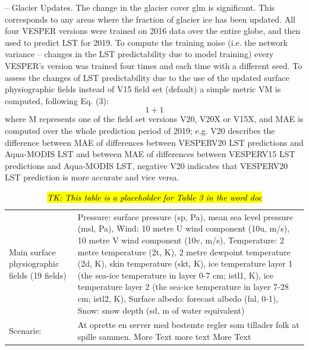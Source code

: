 \documentclass[hess, manuscript]{copernicus}
\begin{document}
– Glacier Updates. The change in the glacier cover glm is significant. This corresponds to any areas where the fraction of glacier ice has been updated.
All four VESPER versions were trained on 2016 data over the entire globe, and then used to predict LST for 2019. To compute the training noise (i.e. the network variance – changes in the LST predictability due to model training) every VESPER’s version was trained four times and each time with a different seed. To assess the changes of LST predictability due to the use of the updated surface physiographic fields instead of V15 field set (default) a simple metric VM is computed, following Eq. (3):
\begin{equation}
	1+1
\end{equation}
where M represents one of the field set versions V20, V20X or V15X, and MAE is computed over the whole prediction period of 2019; e.g. V20 describes the difference between MAE of differences between VESPERV20 LST predictions and Aqua-MODIS LST and between MAE of differences between VESPERV15 LST predictions and Aqua-MODIS LST, negative V20 indicates that VESPERV20 LST prediction is more accurate and vice versa. 


\begin{table}[h]
	\begin{tabularx}{\textwidth}{lX}
		\hline
		Main surface physiographic fields
		(19 fields)          & Pressure: surface pressure (sp, Pa), mean sea level pressure (msl, Pa), 
		Wind: 10 metre U wind component (10u, m/s), 10 metre V wind component (10v, m/s), 
		Temperature: 2 metre temperature (2t, K), 2 metre dewpoint temperature (2d, K), skin temperature (skt, K), ice temperature layer 1 (the sea-ice temperature in layer 0-7 cm; istl1, K), ice temperature layer 2 (the sea-ice temperature in layer 7-28 cm; istl2, K), 
		Surface albedo: forecast albedo (fal, 0-1), 
		Snow: snow depth (sd, m of water equivalent)
		
		\\
		Scenarie:               & At oprette en server med bestemte regler som tillader folk at spille sammen. More Text more text More Text \\
		\hline
	\end{tabularx}
	\caption{\hl{\textit{TK: This table is a placeholder for Table 3 in the word doc}}}
\end{table}
\end{document}
